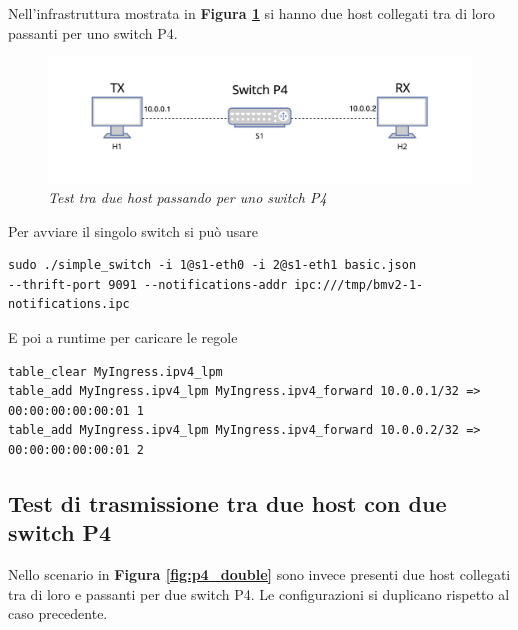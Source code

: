 Nell'infrastruttura mostrata in \textbf{{Figura \ref{fig:p4_basic}}} si hanno due host collegati tra di loro passanti per uno switch P4.
\FloatBarrier
\begin{figure}[h]
\includegraphics[scale=0.5]{images/p4_basic.png}
\centering
\caption{\textit{Test tra due host passando per uno switch P4}}
\label{fig:p4_basic}
\vspace{1cm}
\end{figure}
\FloatBarrier
\leavevmode\newline
Per avviare il singolo switch si può usare
\begin{verbatim}
sudo ./simple_switch -i 1@s1-eth0 -i 2@s1-eth1 basic.json
--thrift-port 9091 --notifications-addr ipc:///tmp/bmv2-1-notifications.ipc
\end{verbatim}
E poi a runtime per caricare le regole 

\begin{verbatim}
table_clear MyIngress.ipv4_lpm
table_add MyIngress.ipv4_lpm MyIngress.ipv4_forward 10.0.0.1/32 => 00:00:00:00:00:01 1
table_add MyIngress.ipv4_lpm MyIngress.ipv4_forward 10.0.0.2/32 => 00:00:00:00:00:01 2
\end{verbatim}

\subsection*{Test di trasmissione tra due host con due switch P4}
Nello scenario in \textbf{{Figura \ref{fig:p4_double}}} sono invece presenti due host collegati tra di loro e passanti per due switch P4. Le configurazioni si duplicano rispetto al caso precedente.

